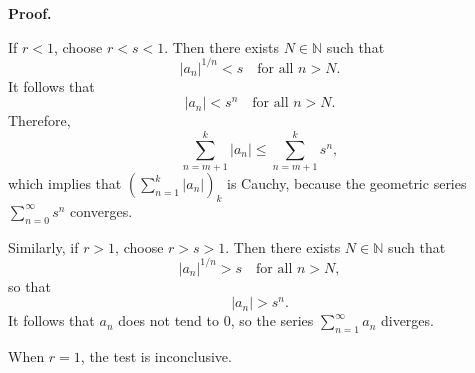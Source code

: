 \documentclass{article}
\begin{document}
\textbf{Proof.}

If \( r < 1 \), choose \( r < s < 1 \).  
Then there exists \( N \in \mathbb{N} \) such that
\[
|a_n|^{1/n} < s \quad \text{for all } n > N.
\]
It follows that
\[
|a_n| < s^n \quad \text{for all } n > N.
\]
Therefore,
\[
\sum_{n=m+1}^{k} |a_n| \le \sum_{n=m+1}^{k} s^n,
\]
which implies that \( \left( \sum_{n=1}^{k} |a_n| \right)_k \) is Cauchy,  
because the geometric series \( \sum_{n=0}^{\infty} s^n \) converges.

Similarly, if \( r > 1 \), choose \( r > s > 1 \).  
Then there exists \( N \in \mathbb{N} \) such that
\[
|a_n|^{1/n} > s \quad \text{for all } n > N,
\]
so that
\[
|a_n| > s^n.
\]
It follows that \( a_n \) does not tend to 0,  
so the series \( \sum_{n=1}^{\infty} a_n \) diverges.

When \( r = 1 \), the test is inconclusive.
\end{document}
